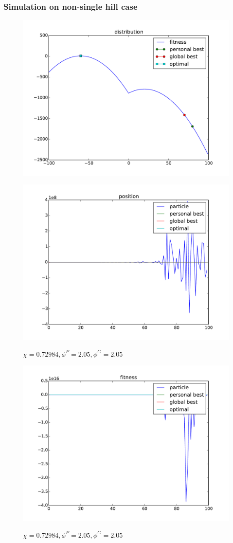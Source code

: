 \subsubsection{Simulation on non-single hill case}

\begin{figure}[ht]
\centering
\includegraphics[width=.7\linewidth]{./simfig/case2/distribution2}
\label{fig:case2-1:distribution} 
\end{figure}

\begin{figure}[ht]
\centering
\includegraphics[width=.7\linewidth]{./simfig/case2/position2-1} 
\label{fig:case2-1:position}
\caption{$ \chi = 0.72984 , \phi^{P} = 2.05 , \phi^{G} = 2.05 $ }
\end{figure}

\begin{figure}[ht]
\centering
\includegraphics[width=.7\linewidth]{./simfig/case2/fitness2-1} 
\label{fig:case2-1:fitness}
\caption{$ \chi = 0.72984 , \phi^{P} = 2.05 , \phi^{G} = 2.05 $ }
\end{figure}

